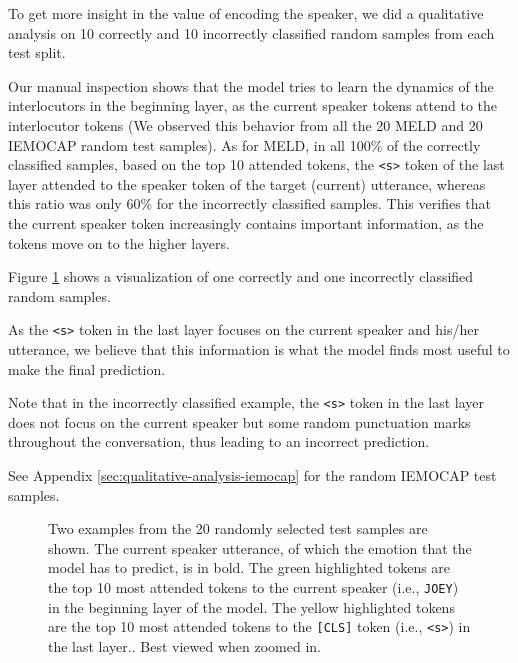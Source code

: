 \documentclass[11pt]{article}
\begin{document}
To get more insight in the value of encoding the speaker, we did a qualitative analysis on 10 correctly and 10 incorrectly classified random samples from each test split. 

Our manual inspection shows that the model tries to learn the dynamics of the interlocutors in the beginning layer, as the current speaker tokens attend to the interlocutor tokens (We observed this behavior from all the 20 MELD and 20 IEMOCAP random test samples). 
As for MELD, in all 100\% of the correctly classified samples, based on the top 10 attended tokens, the \texttt{<s>} token of the last layer attended to the speaker token of the target (current) utterance, whereas this ratio was only 60\% for the incorrectly classified samples. This verifies that the current speaker token increasingly contains important information, as the tokens move on to the higher layers.

Figure \ref{fig:qualitative-analysis} shows a visualization of one correctly and one incorrectly classified random samples.

As the \texttt{<s>} token in the last layer focuses on the current speaker and his/her utterance, we believe that this information is what the model finds most useful to make the final prediction. 

Note that in the incorrectly classified example, the \texttt{<s>} token in the last layer does not focus on the current speaker but some random punctuation marks throughout the conversation, thus leading to an incorrect prediction.

See Appendix \ref{sec:qualitative-analysis-iemocap} for the random IEMOCAP test samples.

\begin{figure}[h]
  \centering
  \hfill
  \caption{Two examples from the 20 randomly selected test samples are shown. The current speaker utterance, of which the emotion that the model has to predict, is in bold. The green highlighted tokens are the top 10 most attended tokens to the current speaker (i.e., \texttt{JOEY}) in the beginning layer of the model. The yellow highlighted tokens are the top 10 most attended tokens to the \texttt{[CLS]} token (i.e., \texttt{<s>}) in the last layer.\protect\footnotemark. Best viewed when zoomed in.}
  \label{fig:qualitative-analysis}
\end{figure}
\end{document}
